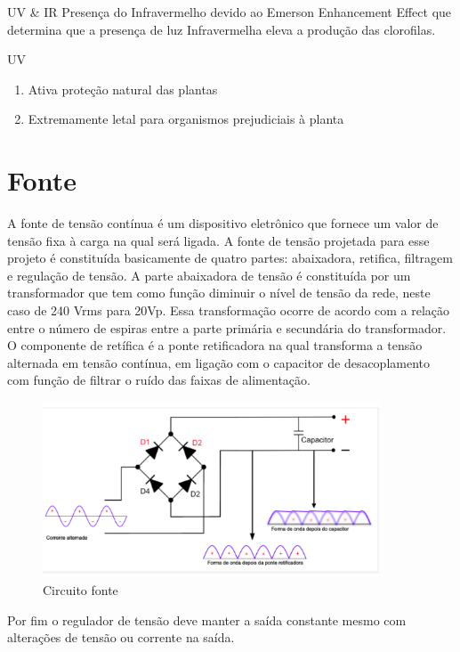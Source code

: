 UV \& IR
Presença do Infravermelho devido ao Emerson Enhancement Effect que determina que a presença de luz Infravermelha eleva a produção das clorofilas.

UV

\begin{enumerate}
	
	\item Ativa proteção natural das plantas
	\item Extremamente letal para organismos prejudiciais à planta
	
	
\end{enumerate}

\section{Fonte}
A fonte de tensão contínua é um dispositivo eletrônico que fornece um valor de tensão fixa à  carga na qual será ligada. A fonte de tensão projetada para esse projeto é constituída basicamente de quatro partes: abaixadora, retifica, filtragem e regulação de tensão.
A parte abaixadora de tensão é constituída por um transformador que tem como função diminuir o nível de tensão da rede, neste caso de 240 Vrms para  20Vp. Essa transformação  ocorre de acordo com a relação entre o número de espiras entre a parte primária e secundária do transformador. \\
O componente de retífica é a ponte retificadora na qual transforma a tensão alternada em tensão contínua, em ligação com o capacitor de desacoplamento com função de filtrar o ruído das faixas de alimentação.

\begin{figure}[H]
	\centering
	\includegraphics[width=10cm]{figuras/circuito_fonte.png}
	\caption{Circuito fonte} \label{circuito fonte}
\end{figure}

Por fim o regulador de tensão deve manter a saída constante mesmo com alterações de tensão ou corrente na saída.
